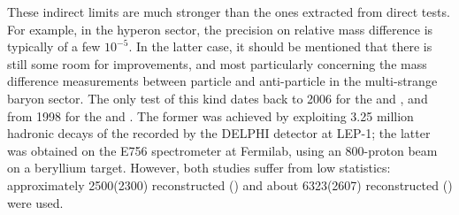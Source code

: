 These indirect limits are much stronger than the ones extracted from direct tests. For example, in the hyperon sector, the precision on relative mass difference is typically of a few $10^{-5}$. In the latter case, it should be mentioned that there is still some room for improvements, and most particularly concerning the mass difference measurements between particle and anti-particle in the multi-strange baryon sector. The only test of this kind dates back to 2006 \cite{abdallahMassesLifetimesProduction2006} for the \rmXiM and \rmAxiP, and from 1998 \cite{chanMeasurementPropertiesOverline1998} for the \rmOmegaM and \rmAomegaP. The former was achieved by exploiting 3.25 million hadronic decays of the \rmZzero recorded by the DELPHI detector at LEP-1; the latter was obtained on the E756 spectrometer at Fermilab, using an 800-\gmom proton beam on a beryllium target. However, both studies suffer from low statistics: approximately 2500(2300) reconstructed \rmXiM (\rmAxiP) and about 6323(2607) reconstructed \rmOmegaM (\rmAomegaP) were used.\\

